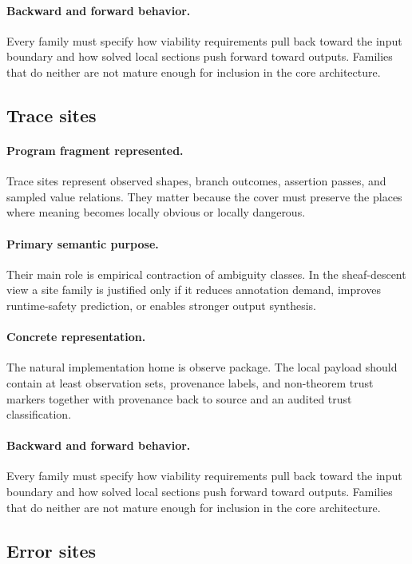 \documentclass[11pt]{report}
\theoremstyle{definition}
\theoremstyle{plain}
\begin{document}
\paragraph{Backward and forward behavior.}
Every family must specify how viability requirements pull back toward the
input boundary and how solved local sections push forward toward outputs.
Families that do neither are not mature enough for inclusion in the core
architecture.

\subsection{Trace sites}

\paragraph{Program fragment represented.}
Trace sites represent observed shapes, branch outcomes, assertion passes, and sampled value relations. They matter because the cover must preserve the
places where meaning becomes locally obvious or locally dangerous.

\paragraph{Primary semantic purpose.}
Their main role is empirical contraction of ambiguity classes. In the sheaf-descent view a site family is
justified only if it reduces annotation demand, improves runtime-safety
prediction, or enables stronger output synthesis.

\paragraph{Concrete representation.}
The natural implementation home is observe package. The local payload should contain
at least observation sets, provenance labels, and non-theorem trust markers together with provenance back to source and an audited
trust classification.

\paragraph{Backward and forward behavior.}
Every family must specify how viability requirements pull back toward the
input boundary and how solved local sections push forward toward outputs.
Families that do neither are not mature enough for inclusion in the core
architecture.

\subsection{Error sites}
\end{document}
